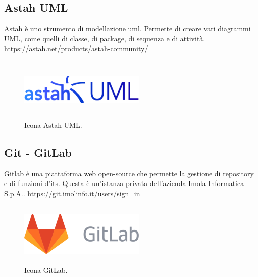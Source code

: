 \subsection*{Astah UML}
Astah è uno strumento di modellazione \gls{uml}. Permette di creare vari diagrammi UML, come quelli di classe, di package, di sequenza e di attività.
\url{https://astah.net/products/astah-community/}
\begin{figure}[H]
    \centering
    \includegraphics[width=6cm, height=3cm]{./immagini/astah.png}
    \caption{Icona Astah UML.}\label{fig:astah}
\end{figure}

\subsection*{Git - GitLab}
Gitlab è una piattaforma web open-source che permette la gestione di repository e di funzioni d'\gls{its}.
Questa è un'istanza privata dell'azienda Imola Informatica S.p.A..
\url{https://git.imolinfo.it/users/sign_in}
\begin{figure}[H]
    \centering
    \includegraphics[width=6cm, height=3cm]{./immagini/gitlab.png}
    \caption{Icona GitLab.}\label{fig:gitlab}
\end{figure}
